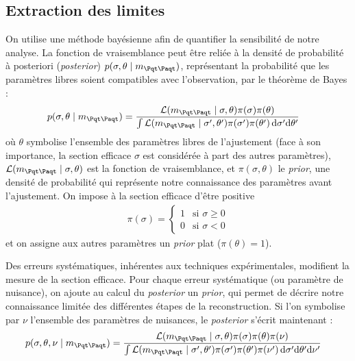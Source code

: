 \subsection{Extraction des limites}

On utilise une méthode bayésienne afin de quantifier la sensibilité de notre analyse. La fonction de vraisemblance peut être reliée à la densité de probabilité à posteriori (\emph{posterior}) $p(\sigma, \theta \mid \mtt)$, représentant la probabilité que les paramètres libres soient compatibles avec l'observation, par le théorème de Bayes :
\begin{align*}
  p(\sigma, \theta \mid \mtt) &= \frac{\mathcal{L}(\mtt \mid \sigma, \theta) \pi(\sigma) \pi(\theta)}{\int{\mathcal{L}(\mtt \mid \sigma^\prime, \theta^\prime) \pi(\sigma^\prime) \pi(\theta^\prime) \, \mathrm{d}\sigma^\prime \mathrm{d}\theta^\prime}}
\end{align*}
où $\theta$ symbolise l'ensemble des paramètres libres de l'ajustement (face à son importance, la section efficace $\sigma$ est considérée à part des autres paramètres), $\mathcal{L}(\mtt \mid \sigma, \theta)$ est la fonction de vraisemblance, et $\pi(\sigma, \theta)$ le \emph{prior}, une densité de probabilité qui représente notre connaissance des paramètres avant l'ajustement. On impose à la section efficace d'être positive
\begin{align*}
\pi(\sigma) = \begin{cases} 1 &\mbox{si } \sigma \geq 0 \\
0 & \mbox{si } \sigma < 0 \end{cases}
\end{align*}
et on assigne aux autres paramètres un \emph{prior} plat ($\pi(\theta) = 1$).

\medskip

Des erreurs systématiques, inhérentes aux techniques expérimentales, modifient la mesure de la section efficace. Pour chaque erreur systématique (ou paramètre de nuisance), on ajoute au calcul du \emph{posterior} un \emph{prior}, qui permet de décrire notre connaissance limitée des différentes étapes de la reconstruction. Si l'on symbolise par $\nu$ l'ensemble des paramètres de nuisances, le \emph{posterior} s'écrit maintenant :
\begin{align*}
  p(\sigma, \theta, \nu \mid \mtt) &= \frac{\mathcal{L}(\mtt \mid \sigma, \theta) \pi(\sigma) \pi(\theta) \pi(\nu)}{\int{\mathcal{L}(\mtt \mid \sigma^\prime, \theta^\prime) \pi(\sigma^\prime) \pi(\theta^\prime) \pi(\nu^\prime) \, \mathrm{d}\sigma^\prime \mathrm{d}\theta^\prime \mathrm{d}\nu^\prime}}
\end{align*}


